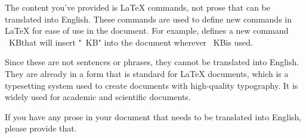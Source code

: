 The content you've provided is LaTeX commands, not prose that can be translated into English. These commands are used to define new commands in LaTeX for ease of use in the document. For example, \newcommand{\KB}{~KB} defines a new command \KB that will insert "~KB" into the document wherever \KB is used. 

Since these are not sentences or phrases, they cannot be translated into English. They are already in a form that is standard for LaTeX documents, which is a typesetting system used to create documents with high-quality typography. It is widely used for academic and scientific documents. 

If you have any prose in your document that needs to be translated into English, please provide that.
